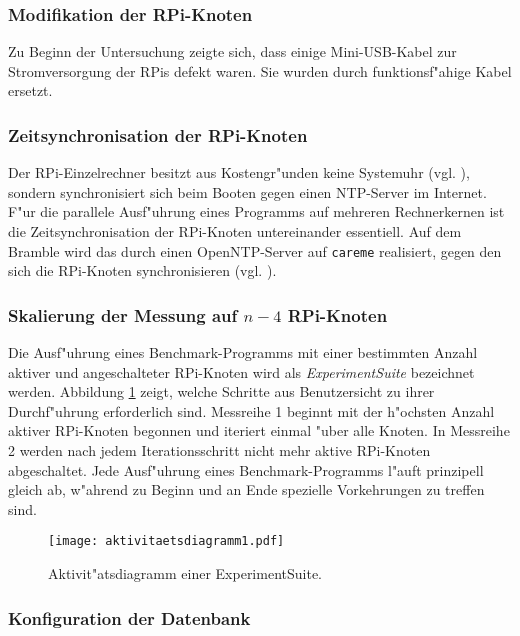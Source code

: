 \subsubsection{Modifikation der RPi-Knoten}

Zu Beginn der Untersuchung zeigte sich, dass einige Mini-USB-Kabel zur Stromversorgung der RPis defekt waren. Sie wurden durch funktionsf"ahige Kabel ersetzt. 

\subsubsection{Zeitsynchronisation der RPi-Knoten} 

Der RPi-Einzelrechner besitzt aus Kostengr"unden keine Systemuhr (vgl. \cite{schmi13}), sondern synchronisiert sich beim Booten gegen einen NTP-Server im Internet. F"ur die parallele Ausf"uhrung eines Programms auf mehreren Rechnerkernen ist die Zeitsynchronisation der RPi-Knoten untereinander essentiell. Auf dem Bramble wird das durch einen OpenNTP-Server auf \texttt{careme} realisiert, gegen den sich die RPi-Knoten synchronisieren (vgl. \cite{kli13}). 

\subsubsection{Skalierung der Messung auf $n-4$ RPi-Knoten} 

Die Ausf"uhrung eines Benchmark-Programms mit einer bestimmten Anzahl aktiver und angeschalteter RPi-Knoten wird als \textit{ExperimentSuite} bezeichnet werden. Abbildung \ref{fig:Aktivitaetsdiagramm} zeigt, welche Schritte aus Benutzersicht zu ihrer Durchf"uhrung erforderlich sind. Messreihe 1 beginnt mit der h"ochsten Anzahl aktiver RPi-Knoten begonnen und iteriert einmal "uber alle Knoten. In Messreihe 2 werden nach jedem Iterationsschritt nicht mehr aktive RPi-Knoten abgeschaltet. Jede Ausf"uhrung eines Benchmark-Programms l"auft prinzipell gleich ab, w"ahrend zu Beginn und an Ende spezielle Vorkehrungen zu treffen sind.  
\begin{figure}[htb]
  \centerline{\texttt{[image: aktivitaetsdiagramm1.pdf]}} 
  \caption{Aktivit"atsdiagramm einer ExperimentSuite.}
  \label{fig:Aktivitaetsdiagramm}
\end{figure}

\subsubsection{Konfiguration der Datenbank}

